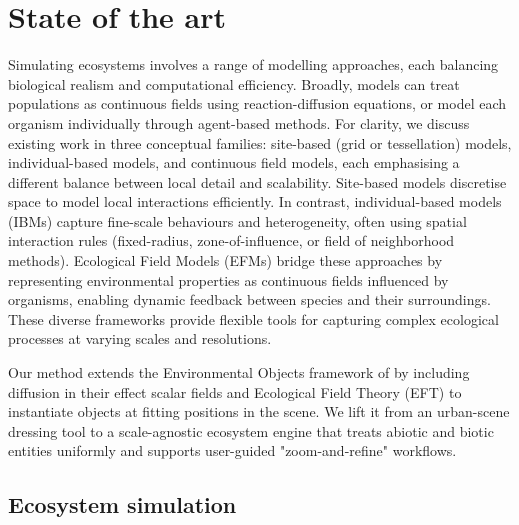 












\section{State of the art}
\label{sec:env-obj-related-works}

Simulating ecosystems involves a range of modelling approaches, each balancing biological realism and computational efficiency. Broadly, models can treat populations as continuous fields using reaction-diffusion equations, or model each organism individually through agent-based methods. For clarity, we discuss existing work in three conceptual families: site-based (grid or tessellation) models, individual-based models, and continuous field models, each emphasising a different balance between local detail and scalability. Site-based models discretise space to model local interactions efficiently. In contrast, individual-based models (IBMs) capture fine-scale behaviours and heterogeneity, often using spatial interaction rules (fixed-radius, zone-of-influence, or field of neighborhood methods). Ecological Field Models (EFMs) bridge these approaches by representing environmental properties as continuous fields influenced by organisms, enabling dynamic feedback between species and their surroundings. These diverse frameworks provide flexible tools for capturing complex ecological processes at varying scales and resolutions.

Our method extends the Environmental Objects framework of \citep{Grosbellet2016} by including diffusion in their effect scalar fields and Ecological Field Theory (EFT) to instantiate objects at fitting positions in the scene. We lift it from an urban-scene dressing tool to a scale-agnostic ecosystem engine that treats abiotic and biotic entities uniformly and supports user-guided "zoom-and-refine" workflows.

\subsection{Ecosystem simulation}

